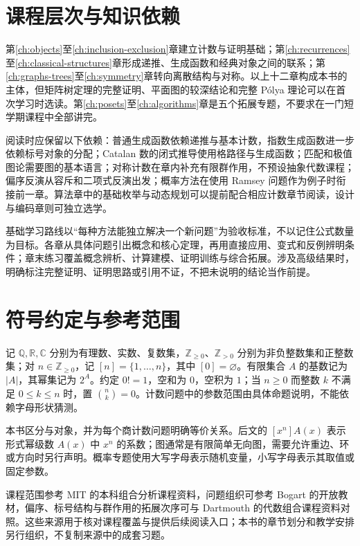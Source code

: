 \documentclass[UTF8,12pt,a4paper,fontset=fandol]{ctexbook}
\begin{document}
\section{课程层次与知识依赖}

第\ref{ch:objects}至\ref{ch:inclusion-exclusion}章建立计数与证明基础；第\ref{ch:recurrences}至\ref{ch:classical-structures}章形成递推、生成函数和经典对象之间的联系；第\ref{ch:graphs-trees}至\ref{ch:symmetry}章转向离散结构与对称。以上十二章构成本书的主体，但矩阵树定理的完整证明、平面图的较深结论和完整 P\'olya 理论可以在首次学习时选读。第\ref{ch:posets}至\ref{ch:algorithms}章是五个拓展专题，不要求在一门短学期课程中全部讲完。

阅读时应保留以下依赖：普通生成函数依赖递推与基本计数，指数生成函数进一步依赖标号对象的分配；Catalan 数的闭式推导使用格路径与生成函数；匹配和极值图论需要图的基本语言；对称计数在章内补充有限群作用，不预设抽象代数课程；偏序反演从容斥和二项式反演出发；概率方法在使用 Ramsey 问题作为例子时衔接前一章。算法章中的基础枚举与动态规划可以提前配合相应计数章节阅读，设计与编码章则可独立选学。

基础学习路线以“每种方法能独立解决一个新问题”为验收标准，不以记住公式数量为目标。各章从具体问题引出概念和核心定理，再用直接应用、变式和反例辨明条件；章末练习覆盖概念辨析、计算建模、证明训练与综合拓展。涉及高级结果时，明确标注完整证明、证明思路或引用不证，不把未说明的结论当作前提。

\section{符号约定与参考范围}

记 $\mathbb Q,\mathbb R,\mathbb C$ 分别为有理数、实数、复数集，$\mathbb Z_{\ge0}$、$\mathbb Z_{>0}$ 分别为非负整数集和正整数集；对 $n\in\mathbb Z_{\ge0}$，记 $[n]=\{1,\ldots,n\}$，其中 $[0]=\varnothing$。有限集合 $A$ 的基数记为 $|A|$，其幂集记为 $2^A$。约定 $0!=1$，空和为 $0$，空积为 $1$；当 $n\ge0$ 而整数 $k$ 不满足 $0\le k\le n$ 时，置 $\binom nk=0$。计数问题中的参数范围由具体命题说明，不能依赖字母形状猜测。

本书区分与对象，并为每个商计数问题明确等价关系。后文的 $[x^n]A(x)$ 表示形式幂级数 $A(x)$ 中 $x^n$ 的系数；图通常是有限简单无向图，需要允许重边、环或方向时另行声明。概率专题使用大写字母表示随机变量，小写字母表示其取值或固定参数。

课程范围参考 MIT 的本科组合分析课程资料\cite{mit-combinatorics}，问题组织可参考 Bogart 的开放教材\cite{bogart}，偏序、标号结构与群作用的拓展次序可与 Dartmouth 的代数组合课程资料\cite{dartmouth-combinatorics}对照。这些来源用于核对课程覆盖与提供后续阅读入口；本书的章节划分和教学安排另行组织，不复制来源中的成套习题。
\end{document}
